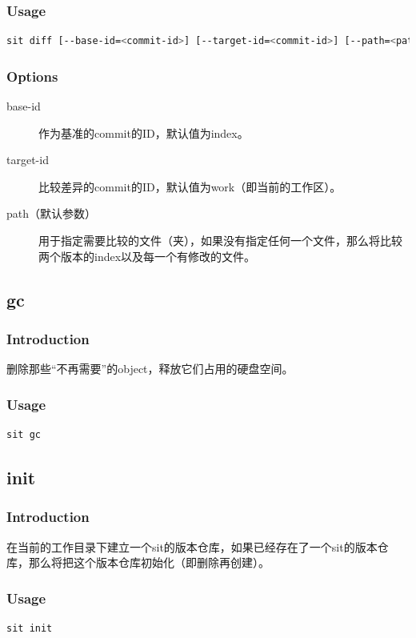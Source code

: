 \documentclass[11pt, a4paper, UTF8]{ctexart}
\begin{document}
\subsubsection{Usage}
\begin{lstlisting}[language=sh,basicstyle=\small\YaHeiMono,numbers=none]
sit diff [--base-id=<commit-id>] [--target-id=<commit-id>] [--path=<path> ...]
\end{lstlisting}
\subsubsection{Options}
\begin{description}
	\item[\YaHeiMono base-id] 作为基准的commit的ID，默认值为index。
	\item[\YaHeiMono target-id] 比较差异的commit的ID，默认值为work（即当前的工作区）。
	\item[\YaHeiMono path（默认参数）] 用于指定需要比较的文件（夹），如果没有指定任何一个文件，那么将比较两个版本的index以及每一个有修改的文件。
\end{description}

\subsection{gc}
\subsubsection{Introduction}
删除那些``不再需要''的object，释放它们占用的硬盘空间。
\subsubsection{Usage}
\begin{lstlisting}[language=sh,basicstyle=\small\YaHeiMono,numbers=none]
sit gc
\end{lstlisting}

\subsection{init}
\subsubsection{Introduction}
在当前的工作目录下建立一个sit的版本仓库，如果已经存在了一个sit的版本仓库，那么将把这个版本仓库初始化（即删除再创建）。
\subsubsection{Usage}
\begin{lstlisting}[language=sh,basicstyle=\small\YaHeiMono,numbers=none]
sit init
\end{lstlisting}
\end{document}
